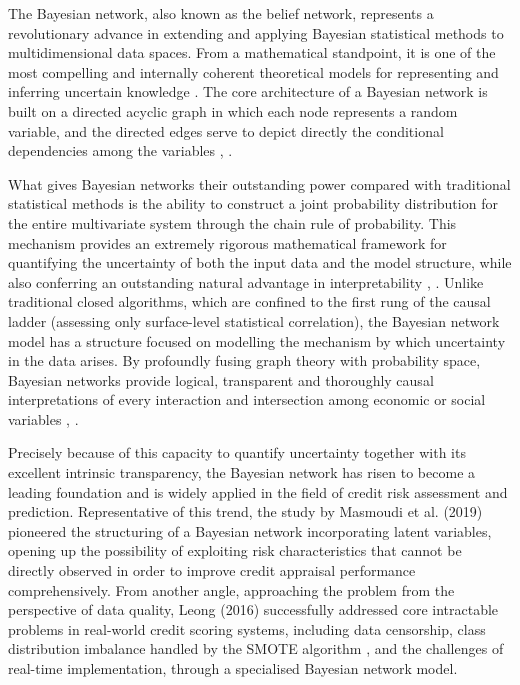 The Bayesian network, also known as the belief network, represents a revolutionary advance in extending and applying Bayesian statistical methods to multidimensional data spaces. From a mathematical standpoint, it is one of the most compelling and internally coherent theoretical models for representing and inferring uncertain knowledge \cite{pearl2009causality}. The core architecture of a Bayesian network is built on a directed acyclic graph in which each node represents a random variable, and the directed edges serve to depict directly the conditional dependencies among the variables \cite{koller2009probabilistic}, \cite{jensen2007bayesian}.

What gives Bayesian networks their outstanding power compared with traditional statistical methods is the ability to construct a joint probability distribution for the entire multivariate system through the chain rule of probability. This mechanism provides an extremely rigorous mathematical framework for quantifying the uncertainty of both the input data and the model structure, while also conferring an outstanding natural advantage in interpretability \cite{darwiche2009modeling}, \cite{spirtes2000causation}. Unlike traditional closed algorithms, which are confined to the first rung of the causal ladder (assessing only surface-level statistical correlation), the Bayesian network model has a structure focused on modelling the mechanism by which uncertainty in the data arises. By profoundly fusing graph theory with probability space, Bayesian networks provide logical, transparent and thoroughly causal interpretations of every interaction and intersection among economic or social variables \cite{scholkopf2021causal}, \cite{peters2017elements}.

Precisely because of this capacity to quantify uncertainty together with its excellent intrinsic transparency, the Bayesian network has risen to become a leading foundation and is widely applied in the field of credit risk assessment and prediction. Representative of this trend, the study by Masmoudi et al. (2019) \cite{masmoudi2019credit} pioneered the structuring of a Bayesian network incorporating latent variables, opening up the possibility of exploiting risk characteristics that cannot be directly observed in order to improve credit appraisal performance comprehensively. From another angle, approaching the problem from the perspective of data quality, Leong (2016) \cite{leong2016credit} successfully addressed core intractable problems in real-world credit scoring systems, including data censorship, class distribution imbalance handled by the SMOTE algorithm \cite{chawla2002smote}, and the challenges of real-time implementation, through a specialised Bayesian network model.

